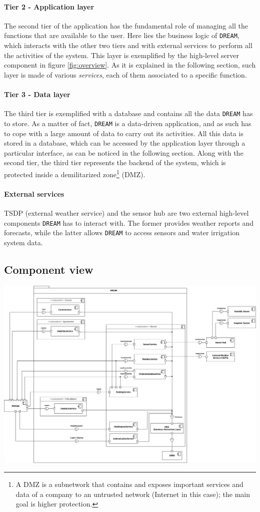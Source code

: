 \documentclass{article}
\begin{document}
\paragraph{Tier 2 - Application layer}
The second tier of the application has the fundamental role of managing all the functions that are available to the user. Here lies the business logic of \verb|DREAM|, which interacts with the other two tiers and with external services to perform all the activities of the system. This layer is exemplified by the high-level server component in figure \ref{fig:overview}. As it is explained in the following section, such layer is made of various \textit{services}, each of them associated to a specific function.
\paragraph{Tier 3 - Data layer}
The third tier is exemplified with a database and contains all the data \verb|DREAM| has to store. As a matter of fact, \verb|DREAM| is a data-driven application, and as such has to cope with a large amount of data to carry out its activities. All this data is stored in a database, which can be accessed by the application layer through a particular interface, as can be noticed in the following section. Along with the second tier, the third tier represents the backend of the system, which is protected inside a demilitarized zone\footnote{A DMZ is a subnetwork that contains and exposes important services and data of a company to an untrusted network (Internet in this case); the main goal is higher protection.} (DMZ).
\paragraph{External services}
TSDP (external weather service) and the sensor hub are two external high-level components \verb|DREAM| has to interact with. The former provides weather reports and forecasts, while the latter allows \verb|DREAM| to access sensors and water irrigation system data. 
\subsection{Component view}\label{Component view}
\includegraphics[width=16.5cm]{diagrams/components_diagram.png}
\end{document}
